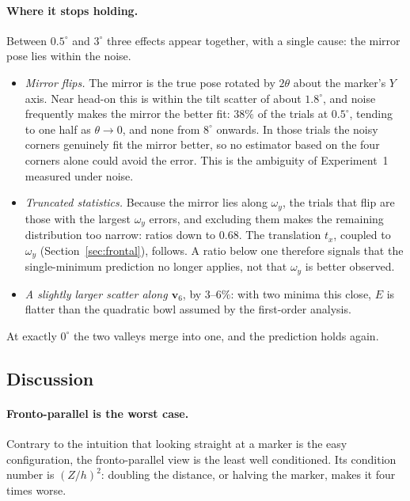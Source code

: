 \documentclass[11pt,a4paper]{article}
\theoremstyle{definition}
\theoremstyle{plain}
\theoremstyle{remark}
\begin{document}
\paragraph{Where it stops holding.} Between $0.5^\circ$ and $3^\circ$ three
effects appear together, with a single cause: the mirror pose lies within the
noise.
\begin{itemize}[leftmargin=*]
  \item \emph{Mirror flips.} The mirror is the true pose rotated by $2\theta$
        about the marker's $Y$ axis. Near head-on this is within the tilt
        scatter of about $1.8^\circ$, and noise frequently makes the mirror the
        better fit: $38\%$ of the trials at $0.5^\circ$, tending to one half as
        $\theta\to0$, and none from $8^\circ$ onwards. In those trials the noisy
        corners genuinely fit the mirror better, so no estimator based on the
        four corners alone could avoid the error. This is the ambiguity of
        Experiment~1 measured under noise.
  \item \emph{Truncated statistics.} Because the mirror lies along $\omega_y$,
        the trials that flip are those with the largest $\omega_y$ errors, and
        excluding them makes the remaining distribution too narrow: ratios down
        to $0.68$. The translation $t_x$, coupled to $\omega_y$
        (Section~\ref{sec:frontal}), follows. A ratio below one therefore
        signals that the single-minimum prediction no longer applies, not that
        $\omega_y$ is better observed.
  \item \emph{A slightly larger scatter along $\mathbf{v}_6$}, by $3$--$6\%$:
        with two minima this close, $E$ is flatter than the quadratic bowl
        assumed by the first-order analysis.
\end{itemize}
At exactly $0^\circ$ the two valleys merge into one, and the prediction holds
again.

\subsection{Discussion}
\label{sec:exp2-discussion}

\paragraph{Fronto-parallel is the worst case.} Contrary to the intuition that
looking straight at a marker is the easy configuration, the fronto-parallel view
is the least well conditioned. Its condition number is $(Z/h)^2$: doubling the
distance, or halving the marker, makes it four times worse.
\end{document}
